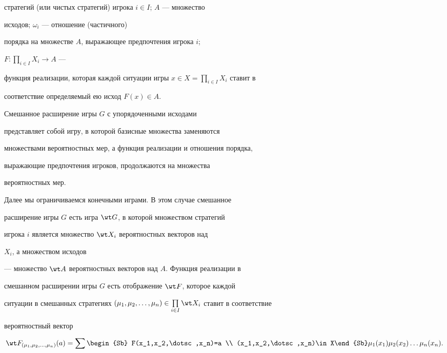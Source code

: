 стратегий (или чистых стратегий) игрока $i\in I$; $A$ --- множество 


исходов; $\omega_i$ --- отношение (частичного) 


порядка на множестве $A$, выражающее предпочтения игрока $i$; 


$F:\prod\limits_{i\in I}X_i\to A$ --- 


функция реализации, которая каждой ситуации игры $x\in 


X=\prod\limits_{i\in I}X_i$ ставит в 


соответствие определяемый ею исход $F(x)\in A$. 


 


Смешанное расширение игры $G$ с упорядоченными исходами 


представляет собой игру, в которой базисные множества заменяются 


множествами вероятностных мер, а функция реализации и отношения порядка, 


выражающие предпочтения игроков, продолжаются на множества 


вероятностных мер. 


 


Далее мы ограничиваемся конечными играми. В этом случае смешанное 


расширение игры $G$ есть игра $\wt G$, в которой множеством стратегий 


игрока $i$ является множество $\wt X_i$ вероятностных векторов над 


$X_i$, а множеством исходов 


--- множество $\wt A$ вероятностных векторов над $A$. Функция реализации в 


смешанном расширении игры $G$ есть отображение $\wt F$, которое каждой 


ситуации в смешанных стратегиях $(\mu_1,\mu_2,\dotsc,\mu_n)\in 


\prod\limits_{i\in I}\wt X_i$ ставит в соответствие 


вероятностный вектор 


\begin{equation} 


\wt F_{(\mu_1,\mu_2,\dotsc,\mu_n)}(a)=\sum\begin{Sb} 


F(x_1,x_2,\dotsc,x_n)=a \\ (x_1,x_2,\dotsc,x_n)\in X\end{Sb} 


\mu_1(x_1)\mu_2(x_2)\dotsc\mu_n(x_n). 


\end{equation} 


